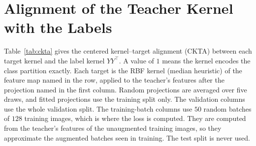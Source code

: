 \section{Alignment of the Teacher Kernel with the Labels}
\label{app:ckta}

Table~\ref{tab:ckta} gives the centered kernel--target alignment (CKTA) between each target kernel and the label kernel $YY^{\top}$. A value of $1$ means the kernel encodes the class partition exactly.
Each target is the RBF kernel (median heuristic) of the feature map named in the row, applied to the teacher's features after the projection named in the first column.
Random projections are averaged over five draws, and fitted projections use the training split only.
The validation columns use the whole validation split. The training-batch columns use $50$ random batches of $128$ training images, which is where the loss is computed. They are computed from the teacher's features of the unaugmented training images, so they approximate the augmented batches seen in training.
The test split is never used.

\begin{table}[t]
  \centering
  \caption{Centered kernel--target alignment of the teacher kernel with the label kernel, on validation and on $128$-image training batches.}
  \label{tab:ckta}
\end{table}
